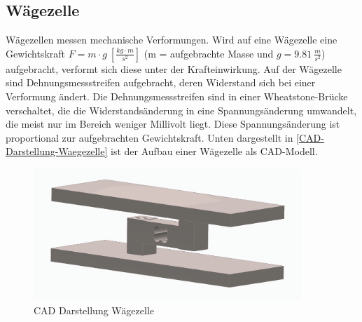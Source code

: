 \subsection{Wägezelle}
Wägezellen messen mechanische Verformungen.
Wird auf eine Wägezelle eine Gewichtskraft \mbox{$F = m \cdot g \: [\frac{kg \cdot m}{s^2}]$} (m = aufgebrachte Masse und $g = 9.81 \: \frac{m}{s^2}$)  aufgebracht, verformt sich diese unter der Krafteinwirkung.
Auf der Wägezelle sind Dehnungsmessstreifen aufgebracht, deren Widerstand sich bei einer Verformung ändert.
Die Dehnungsmessstreifen sind in einer Wheatstone-Brücke verschaltet, die die Widerstandsänderung in eine Spannungsänderung umwandelt, die meist nur im Bereich weniger Millivolt liegt.
Diese Spannungsänderung ist proportional zur aufgebrachten Gewichtskraft.
Unten dargestellt in \autoref{CAD-Darstellung-Waegezelle} ist der Aufbau einer Wägezelle als CAD-Modell. \\
\begin{figure}[h!]
    \centering
    \includegraphics[width=0.9\textwidth]{img/CAD_Waegezelle.png}
    \caption{CAD Darstellung Wägezelle}
    \label{fig:CAD-Darstellung-Waegezelle}
\end{figure}

